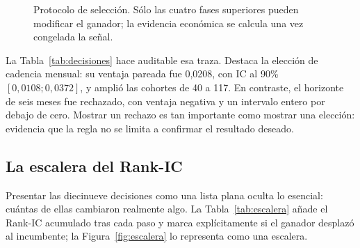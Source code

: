 \begin{figure}[H]
  \centering
  \caption{Protocolo de selección. Sólo las cuatro fases superiores pueden modificar el ganador;
  la evidencia económica se calcula una vez congelada la señal.}
  \label{fig:protocolo}
\end{figure}

La Tabla~\ref{tab:decisiones} hace auditable esa traza. Destaca la elección de cadencia mensual:
su ventaja pareada fue 0,0208, con IC al 90\% $[0,0108;0,0372]$, y amplió las cohortes de 40 a 117.
En contraste, el horizonte de seis meses fue rechazado, con ventaja negativa y un intervalo entero
por debajo de cero. Mostrar un rechazo es tan importante como mostrar una elección: evidencia que
la regla no se limita a confirmar el resultado deseado.

\begin{table}[H]
  \centering
  \small
  \caption{Traza de decisiones del Model Study.}
  \label{tab:decisiones}
  
  \caption*{Fuente: . Ventaja e intervalo frente al incumbente de cada fase.}
\end{table}

\subsection*{La escalera del Rank-IC}

Presentar las diecinueve decisiones como una lista plana oculta lo esencial: cuántas de ellas
cambiaron realmente algo. La Tabla~\ref{tab:escalera} añade el Rank-IC acumulado tras cada paso y
marca explícitamente si el ganador desplazó al incumbente; la Figura~\ref{fig:escalera} lo
representa como una escalera.

